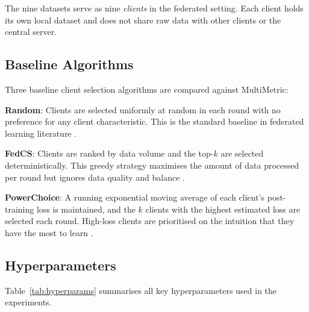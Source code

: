 The nine datasets serve as nine \emph{clients} in the federated setting. Each client holds its own local dataset and does not share raw data with other clients or the central server.

\subsection{Baseline Algorithms}

Three baseline client selection algorithms are compared against MultiMetric:

\textbf{Random}: Clients are selected uniformly at random in each round with no preference for any client characteristic. This is the standard baseline in federated learning literature \citep{mcmahan2017communication}.

\textbf{FedCS}: Clients are ranked by data volume and the top-$k$ are selected deterministically. This greedy strategy maximises the amount of data processed per round but ignores data quality and balance \citep{nishio2019client}.

\textbf{PowerChoice}: A running exponential moving average of each client's post-training loss is maintained, and the $k$ clients with the highest estimated loss are selected each round. High-loss clients are prioritised on the intuition that they have the most to learn \citep{cho2020power}.

\subsection{Hyperparameters}

Table~\ref{tab:hyperparams} summarises all key hyperparameters used in the experiments.

